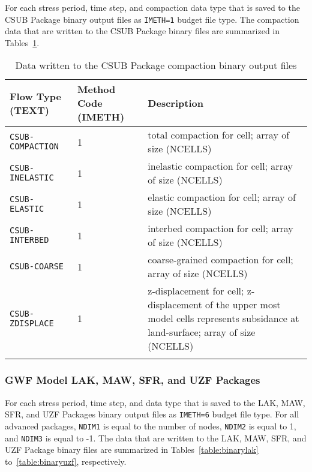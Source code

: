 \vspace{5mm}
For each stress period, time step, and compaction data type that is saved to the CSUB Package binary output files as \texttt{IMETH=1} budget file type. The compaction data that are written to the CSUB Package binary files are summarized in Tables~\ref{table:binarycsub}.

\begin{longtable}{p{3.5cm} p{2cm} p{9cm}}
	\caption{Data written to the CSUB Package compaction binary output files} 
	\tabularnewline
		\hline
		\textbf{Flow Type (TEXT)} & \textbf{Method Code (IMETH)} & \textbf{Description} \\
		\hline
	\endhead
		\hline
	\endfoot
	\texttt{CSUB-COMPACTION} & 1 & total compaction for cell; array of size (NCELLS) \\
	\texttt{CSUB-INELASTIC} & 1 & inelastic compaction for cell; array of size (NCELLS) \\
	\texttt{CSUB-ELASTIC} & 1 & elastic compaction for cell; array of size (NCELLS) \\
	\texttt{CSUB-INTERBED} & 1 & interbed compaction for cell; array of size (NCELLS) \\
	\texttt{CSUB-COARSE} & 1 & coarse-grained compaction for cell; array of size (NCELLS) \\
	\texttt{CSUB-ZDISPLACE} & 1 & z-displacement for cell; z-displacement of the upper most model cells represents subsidance at land-surface; array of size (NCELLS) \\
	\label{table:binarycsub}
\end{longtable}

\subsubsection{GWF Model LAK, MAW, SFR, and UZF Packages}

\vspace{5mm}
For each stress period, time step, and data type that is saved to the LAK, MAW, SFR, and UZF Packages binary output files as \texttt{IMETH=6} budget file type. For all advanced packages, \texttt{NDIM1} is equal to the number of nodes, \texttt{NDIM2} is equal to 1, and \texttt{NDIM3} is equal to -1. The data that are written to the LAK, MAW, SFR, and UZF Package binary files are summarized in Tables~\ref{table:binarylak} to~\ref{table:binaryuzf}, respectively.


